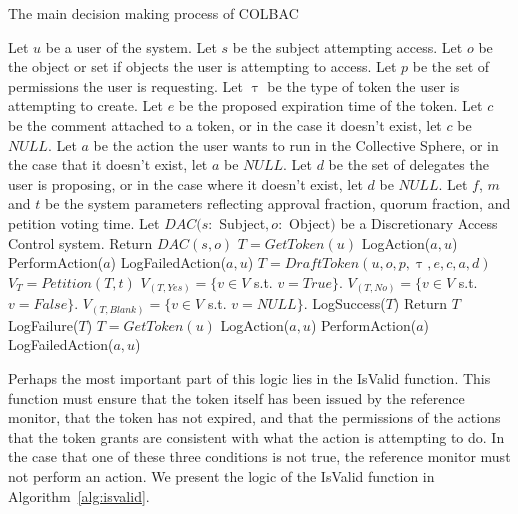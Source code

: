 \begin{algorithm}
\caption{The main decision making process of COLBAC}
\label{alg:main}
\begin{algorithmic}[1]
\State Let $u$ be a user of the system.
\State Let $s$ be the subject attempting access.
\State Let $o$ be the object or set if objects the user is attempting to access.
\State Let $p$ be the set of permissions the user is requesting.
\State Let $\uptau$ be the type of token the user is attempting to create.
\State Let $e$ be the proposed expiration time of the token.
\State Let $c$ be the comment attached to a token, or in the case it doesn't exist,
let $c$ be $NULL$.
\State Let $a$ be the action the user wants to run in the Collective Sphere, or in the
case that it doesn't exist, let $a$ be $NULL$.
\State Let $d$ be the set of delegates the user is proposing, or in the case where it
doesn't exist, let $d$ be $NULL$.
\State Let $f$, $m$ and $t$ be the system parameters reflecting approval
fraction, quorum fraction, and petition voting time.
\State Let $DAC(s :$ Subject$, o:$ Object$)$ be a Discretionary Access Control
system.
    \State Return $DAC(s,o)$
    \State $T = GetToken(u)$
            \State LogAction($a, u$)
            \State PerformAction($a$)
        \Else
            \State LogFailedAction($a, u$)
        \EndIf
    \Else
        \State $T = DraftToken(u,o,p,\uptau,e,c,a,d)$
            \State $V_{T} = Petition(T, t)$
            \State $V_{(T, Yes)} = \{v \in V$ s.t. $v = True\}.$
            \State $V_{(T, No)} = \{v \in V$ s.t. $v = False\}.$
            \State $V_{(T, Blank)} = \{v \in V$ s.t. $v = NULL\}$.
                \State LogSuccess($T$)
                \State Return $T$
            \Else
                \State LogFailure($T$)
            \EndIf
        \EndIf
    \EndIf
\Else
    \State $T = GetToken(u)$
        \State LogAction($a, u$)
        \State PerformAction($a$)
    \Else
        \State LogFailedAction($a, u$)
    \EndIf
\EndIf
\end{algorithmic}
\end{algorithm}

Perhaps the most important part of this logic lies in the IsValid function. This
function must ensure that the token itself has been issued by the reference
monitor, that the token has not expired, and that the permissions of the actions
that the token grants are consistent with what the action is attempting to do.
In the case that one of these three conditions is not true, the reference
monitor must not perform an action. We present the logic of the IsValid function
in Algorithm~\ref{alg:isvalid}.

